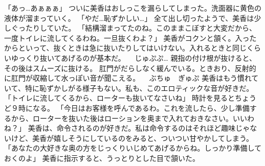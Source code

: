 「あっ…あぁぁぁ」
ついに美香はおしっこを漏らしてしまった。洗面器に黄色の液体が溜まっていく。
「やだ…恥ずかしい…」
全て出し切ったようで、美香は少しぐったりしていた。
「結構溜まってたのね。このままこぼすと大変だから、一度トイレに流してくるわね。一旦抜くわよ？」
美香がコクンと頷く。入ったからといって、抜くときは急に抜いたりしてはいけない。入れるときと同じくらいゆっくり抜いてあげるのが基本だ。
　じゅぷぷ…
親指の付け根が抜けると、その後はスムーズに抜ける。
肛門がだらしなく緩んでいる。ときおり、反射的に肛門が収縮して水っぽい音が聞こえる。
　ぶちゅ　ぎゅぷ
美香はもう慣れていて、特に恥ずかしがる様子もない。私も、このエロティックな音が好きだ。
「トイレに流してくるから、ローターも抜いてなさいね」
時計を見るとちょうど９時になる。
「今日はお客様を呼んであるわ。これを流したら、少し準備するから、ローターを抜いた後はローションを奥まで入れておきなさい。いいわね？」
美香は、命令されるのが好きだ。私は命令するのはそれほど趣味じゃないけど、美香が嬉しそうにしているのをみると、ついつい甘やかしてしまう。
「あなたの大好きな奥の方をじっくりいじめてあげるからね。しっかり準備しておくのよ」
美香に指示すると、うっとりとした目で頷いた。

